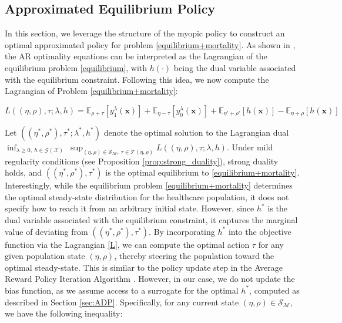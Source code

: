 \documentclass[12pt,a4paper]{article}
\newcommand{\bx}{\mathbf{x}}
\begin{document}
		

		
		
		\subsection{Approximated Equilibrium Policy \label{equilibrium_policy}}
		
	
        


In this section, we leverage the structure of the myopic policy to construct an optimal approximated policy for problem \eqref{equilibrium+mortality}. As shown in \cite{measurized}, the AR optimality equations can be interpreted as the Lagrangian of the equilibrium problem \eqref{equilibrium}, with $h(\cdot)$ being the dual variable associated with the equilibrium constraint. Following this idea, we now compute the Lagrangian of Problem \eqref{equilibrium+mortality}:

        \begin{equation}\label{L}
            L((\eta,\rho),\tau;\lambda,h)=\mathbb{E}_{\rho+\tau}\left[  y_1^\lambda(\bx)\right]       + \mathbb{E}_{\eta-\tau}\left[  y_0^\lambda(\bx)\right] + \mathbb{E}_{\eta'+\rho'}\left[h(\bx)\right]- \mathbb{E}_{\eta+\rho}\left[h(\bx)\right]
        \end{equation}
        

\noindent Let $((\eta^*, \rho^*), \tau^*; \lambda^*, h^*)$ denote the optimal solution to the Lagrangian dual\newline $
\inf_{\lambda \geq 0,\ h \in \mathcal{G}(\mathcal{X})} \ \sup_{(\eta, \rho) \in \mathcal{S}_{\mathcal{M}},\ \tau \in \mathcal{T}(\eta, \rho)} L((\eta, \rho), \tau;\lambda, h).
$
Under mild regularity conditions (see Proposition \ref{prop:strong_duality}), strong duality holds, and $((\eta^*, \rho^*), \tau^*)$ is the optimal equilibrium to \eqref{equilibrium+mortality}. Interestingly, while the equilibrium problem \eqref{equilibrium+mortality} determines the optimal steady-state distribution for the healthcare population, it does not specify how to reach it from an arbitrary initial state. However, since $h^*$ is the dual variable associated with the equilibrium constraint, it captures the marginal value of deviating from $((\eta^*, \rho^*), \tau^*)$. By incorporating $h^*$ into the objective function via the Lagrangian \eqref{L}, we can compute the optimal action $\tau$ for any given population state $(\eta, \rho)$, thereby steering the population toward the optimal steady-state. This is similar to the policy update step in the Average Reward Policy Iteration Algorithm \citep{PIA}. However, in our case, we do not update the bias function, as we assume access to a surrogate for the optimal $h^*$, computed as described in Section \ref{sec:ADP}. Specifically, for any current state $(\eta, \rho) \in \mathcal{S}_{\mathcal{M}}$, we have the following inequality:
\end{document}
